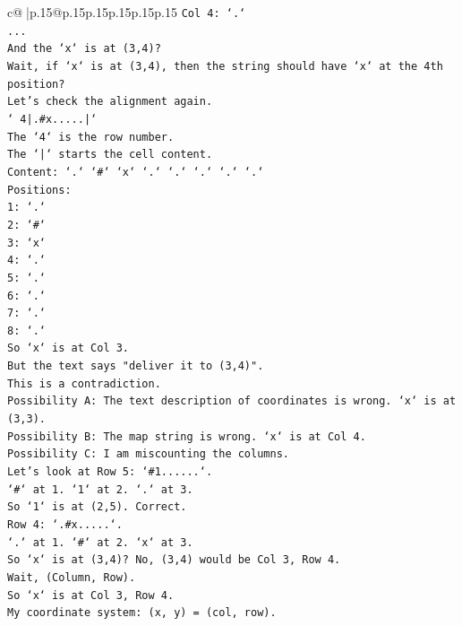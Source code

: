 \documentclass{article}
\begin{document}
{\begin{supertabular}{c@{$\;$}|p{.15\linewidth}@{}p{.15\linewidth}p{.15\linewidth}p{.15\linewidth}p{.15\linewidth}p{.15\linewidth}}
{{{\texttt{Col 4: `.`} \\
\texttt{...} \\
\texttt{And the `x` is at (3,4)?} \\
\texttt{Wait, if `x` is at (3,4), then the string should have `x` at the 4th position?} \\
\texttt{Let's check the alignment again.} \\
\texttt{` 4|.\#x.....|`} \\
\texttt{The `4` is the row number.} \\
\texttt{The `|` starts the cell content.} \\
\texttt{Content: `.` `\#` `x` `.` `.` `.` `.` `.`} \\
\texttt{Positions:} \\
\texttt{1: `.`} \\
\texttt{2: `\#`} \\
\texttt{3: `x`} \\
\texttt{4: `.`} \\
\texttt{5: `.`} \\
\texttt{6: `.`} \\
\texttt{7: `.`} \\
\texttt{8: `.`} \\
\texttt{So `x` is at Col 3.} \\
\texttt{But the text says "deliver it to (3,4)".} \\
\texttt{This is a contradiction.} \\
\texttt{Possibility A: The text description of coordinates is wrong. `x` is at (3,3).} \\
\texttt{Possibility B: The map string is wrong. `x` is at Col 4.} \\
\texttt{Possibility C: I am miscounting the columns.} \\
\texttt{Let's look at Row 5: `\#1......`.} \\
\texttt{`\#` at 1. `1` at 2. `.` at 3.} \\
\texttt{So `1` is at (2,5). Correct.} \\
\texttt{Row 4: `.\#x.....`.} \\
\texttt{`.` at 1. `\#` at 2. `x` at 3.} \\
\texttt{So `x` is at (3,4)? No, (3,4) would be Col 3, Row 4.} \\
\texttt{Wait, (Column, Row).} \\
\texttt{So `x` is at Col 3, Row 4.} \\
\texttt{My coordinate system: (x, y) = (col, row).} \\
}}}
\end{supertabular}}
\end{document}
